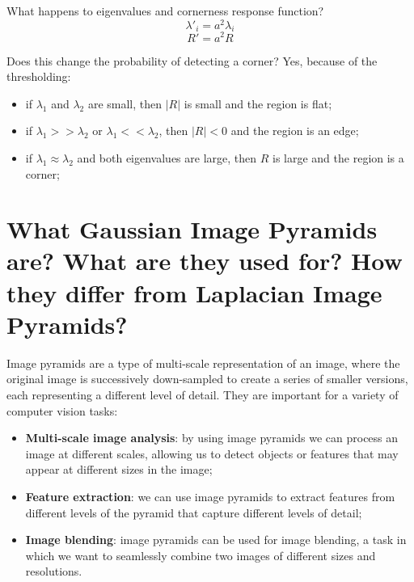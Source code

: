 \documentclass{article}
\begin{document}
\begin{itemize}
\begin{itemize}
        What happens to eigenvalues and cornerness response function?
        \begin{equation*}
            \lambda'_i = a^2\lambda_i
        \end{equation*}
        \begin{equation*}
            R'=a^2R
        \end{equation*}
        
        Does this change the probability of detecting a corner? Yes, because of the thresholding:
        \begin{itemize}
            \item if $\lambda_1$ and $\lambda_2$ are small, then $|R|$ is small and the region is flat;
            \item if $\lambda_1 >> \lambda_2$ or $\lambda_1 <<\lambda_2$, then $|R| < 0$ and the region is an edge;
            \item if $\lambda_1 \approx \lambda_2$ and both eigenvalues are large, then $R$ is large and the region is a corner;
        \end{itemize}
        
    \end{itemize}
\end{itemize}

\newpage

\section{What Gaussian Image Pyramids are? What are they used for? How they differ from Laplacian Image Pyramids?}

Image pyramids are a type of multi-scale representation of an image, where the original image is successively down-sampled to create a series of smaller versions, each representing a different level of detail.
They are important for a variety of computer vision tasks:

\begin{itemize}
    \item \textbf{Multi-scale image analysis}: by using image pyramids we can process an image at different scales, allowing us to detect objects or features that may appear at different sizes in the image;
    \item \textbf{Feature extraction}: we can use image pyramids to extract features from different levels of the pyramid that capture different levels of detail;
    \item \textbf{Image blending}: image pyramids can be used for image blending, a task in which we want to seamlessly combine two images of different sizes and resolutions. 
\end{itemize}
\end{document}
